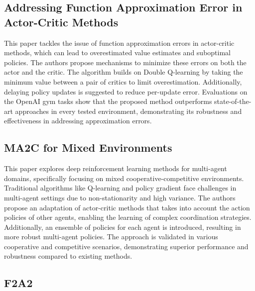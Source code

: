 \documentclass[journal]{IEEEtran}
\begin{document}
\subsection{Addressing Function Approximation Error in Actor-Critic Methods}
This paper tackles the issue of function approximation errors in actor-critic methods, which can lead to overestimated value estimates and suboptimal policies. The authors propose mechanisms to minimize these errors on both the actor and the critic. The algorithm builds on Double Q-learning by taking the minimum value between a pair of critics to limit overestimation. Additionally, delaying policy updates is suggested to reduce per-update error. Evaluations on the OpenAI gym tasks show that the proposed method outperforms state-of-the-art approaches in every tested environment, demonstrating its robustness and effectiveness in addressing approximation errors.
\cite{fujimoto2018}

\subsection{MA2C for Mixed Environments}
This paper explores deep reinforcement learning methods for multi-agent domains, specifically focusing on mixed cooperative-competitive environments. Traditional algorithms like Q-learning and policy gradient face challenges in multi-agent settings due to non-stationarity and high variance. The authors propose an adaptation of actor-critic methods that takes into account the action policies of other agents, enabling the learning of complex coordination strategies. Additionally, an ensemble of policies for each agent is introduced, resulting in more robust multi-agent policies. The approach is validated in various cooperative and competitive scenarios, demonstrating superior performance and robustness compared to existing methods.
\cite{lowe2020}

\subsection{F2A2}
\cite{li2023d}
\end{document}
